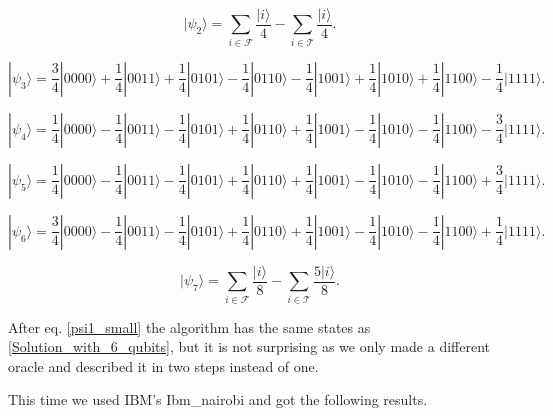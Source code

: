 \begin{equation}
    |\psi_2\rangle =  \sum_{i\in \mathcal{F}}^{} \frac{|i\rangle }{4} -\sum_{i\in \mathcal{T}}^{} \frac{|i\rangle }{4}.
\end{equation}

\begin{equation}
    |\psi_3\rangle =  \frac{3}{4}|0000\rangle+\frac{1}{4}|0011\rangle+\frac{1}{4}|0101\rangle-\frac{1}{4}|0110\rangle-\frac{1}{4}|1001\rangle+\frac{1}{4}|1010\rangle+\frac{1}{4}|1100\rangle-\frac{1}{4}|1111\rangle.
\end{equation}

\begin{equation}
    |\psi_4\rangle = \frac{1}{4}|0000\rangle-\frac{1}{4}|0011\rangle-\frac{1}{4}|0101\rangle+\frac{1}{4}|0110\rangle+\frac{1}{4}|1001\rangle-\frac{1}{4}|1010\rangle-\frac{1}{4}|1100\rangle-\frac{3}{4}|1111\rangle.
\end{equation}

\begin{equation}
    |\psi_5\rangle = \frac{1}{4}|0000\rangle-\frac{1}{4}|0011\rangle-\frac{1}{4}|0101\rangle+\frac{1}{4}|0110\rangle+\frac{1}{4}|1001\rangle-\frac{1}{4}|1010\rangle-\frac{1}{4}|1100\rangle+\frac{3}{4}|1111\rangle.
\end{equation}

\begin{equation}
    |\psi_6\rangle = \frac{3}{4}|0000\rangle-\frac{1}{4}|0011\rangle-\frac{1}{4}|0101\rangle+\frac{1}{4}|0110\rangle+\frac{1}{4}|1001\rangle-\frac{1}{4}|1010\rangle-\frac{1}{4}|1100\rangle+\frac{1}{4}|1111\rangle.
\end{equation}

\begin{equation}
    |\psi_7\rangle =  \sum_{i\in \mathcal{F}}^{} \frac{|i\rangle }{8} -\sum_{i\in \mathcal{T}}^{} \frac{5|i\rangle }{8}.
\end{equation}

After eq. \ref{psi1_small} the algorithm has the same states as \ref{Solution_with_6_qubits}, but it is not surprising as we only made a different oracle and described it in two steps instead of one.

This time we used IBM's Ibm\_nairobi and got the following results.

